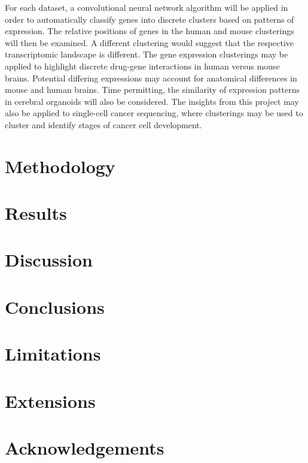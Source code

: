 \documentclass[12pt,oneside,onecolumn,a4paper]{article}
\begin{document}
For each dataset, a convolutional neural network algorithm will be applied in order to automatically classify genes into discrete clusters based on patterns of expression. The relative positions of genes in the human and mouse clusterings will then be examined. A different clustering would suggest that the respective transcriptomic landscape is different. The gene expression clusterings may be applied to highlight discrete drug-gene interactions in human versus mouse brains. Potential differing expressions may account for anatomical differences in mouse and human brains. Time permitting, the similarity of expression patterns in cerebral organoids will also be considered. The insights from this project may also be applied to single-cell cancer sequencing, where clusterings may be used to cluster and identify stages of cancer cell development.

\section{Methodology}

\section{Results}

\section{Discussion}

\section{Conclusions}

\section{Limitations}

\section{Extensions}

\section{Acknowledgements}



\end{document}
